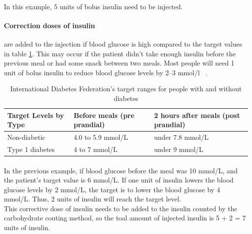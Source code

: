\paragraph{}
In this example, 5 units of bolus insulin need to be injected. 

\paragraph{Correction doses of insulin} are added to the injection if blood glucose is high compared to the target values in table \ref{table:targetValues}. This may occur if the patient didn't take enough insulin before the previous meal or had some snack between two meals. Most people will need 1 unit of bolus insulin to reduce blood glucose levels by 2–3 mmol/l ~\cite{carbcountPdf}. 


\begin{table}
    \begin{tabular}{|l|l|l|}
    \hline
    Target Levels by Type & Before meals (pre prandial) & 2 hours after meals (post prandial) \\ \hline
    Non-diabetic          & 4.0 to 5.9 mmol/L           & under 7.8 mmol/L                    \\ 
    Type 1 diabetes       & 4 to 7 mmol/L               & under 9 mmol/L                      \\ \hline
    \end{tabular}
    
    \caption{International Diabetes Federation's target ranges for people with and without diabetes}
    \label{table:targetValues}
\end{table}


\paragraph{}In the previous example, if blood glucose before the meal was 10 mmol/L, and the patient's target value is 6 mmol/L. If one unit of insulin lowers the blood glucose levels by 2 mmol/L, the target is to lower the blood glucose by 4 mmol/L. Thus, 2 units of insulin will reach the target level.
\\This corrective dose of insulin needs to be added to the insulin counted by the carbohydrate couting method, so the toal amount of injected insulin is 5 + 2 = 7 units of insulin.

